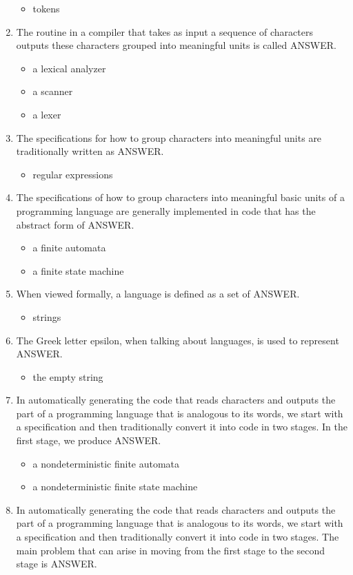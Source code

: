 \documentclass{exam}
\begin{document}
\begin{enumerate}
\begin{itemize}
\item tokens
\end{itemize}
\item The routine in a compiler that takes as input a sequence of characters outputs these characters grouped into meaningful units is called ANSWER.
\begin{itemize}
\item a lexical analyzer
\item a scanner
\item a lexer
\end{itemize}
\item The specifications for how to group characters into meaningful units are traditionally written as ANSWER.
\begin{itemize}
\item regular expressions
\end{itemize}
\item The specifications of how to group characters into meaningful basic units of a programming language are generally implemented in code that has the abstract form of ANSWER.
\begin{itemize}
\item a finite automata
\item a finite state machine
\end{itemize}
\item When viewed formally, a language is defined as a set of ANSWER.
\begin{itemize}
\item strings
\end{itemize}
\item The Greek letter epsilon, when talking about languages, is used to represent ANSWER.
\begin{itemize}
\item the empty string
\end{itemize}
\item In automatically generating the code that reads characters and outputs the part of a programming language that is analogous to its words, we start with a specification and then traditionally convert it into code in two stages.  In the first stage, we produce ANSWER.
\begin{itemize}
\item a nondeterministic finite automata
\item a nondeterministic finite state machine
\end{itemize}
\item In automatically generating the code that reads characters and outputs the part of a programming language that is analogous to its words, we start with a specification and then traditionally convert it into code in two stages.  The main problem that can arise in moving from the first stage to the second stage is ANSWER.

\end{enumerate}
\end{document}

